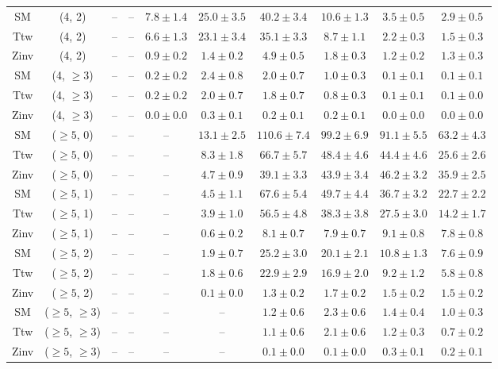 \begin{table}[h!]
{\begin{tabular}{cccccccccc}
	SM & (4, 2) & -- & -- & $7.8\pm 1.4$ & $25.0\pm 3.5$ & $40.2\pm 3.4$ & $10.6\pm 1.3$ & $3.5\pm 0.5$ & $2.9\pm 0.5$ \\[0.5ex] 
	Ttw & (4, 2) & -- & -- & $6.6\pm 1.3$ & $23.1\pm 3.4$ & $35.1\pm 3.3$ & $8.7\pm 1.1$ & $2.2\pm 0.3$ & $1.5\pm 0.3$ \\[0.5ex] 
	Zinv & (4, 2) & -- & -- & $0.9\pm 0.2$ & $1.4\pm 0.2$ & $4.9\pm 0.5$ & $1.8\pm 0.3$ & $1.2\pm 0.2$ & $1.3\pm 0.3$ \\[0.5ex] 
	SM & (4, $\ge3$) & -- & -- & $0.2\pm 0.2$ & $2.4\pm 0.8$ & $2.0\pm 0.7$ & $1.0\pm 0.3$ & $0.1\pm 0.1$ & $0.1\pm 0.1$ \\[0.5ex] 
	Ttw & (4, $\ge3$) & -- & -- & $0.2\pm 0.2$ & $2.0\pm 0.7$ & $1.8\pm 0.7$ & $0.8\pm 0.3$ & $0.1\pm 0.1$ & $0.1\pm 0.0$ \\[0.5ex] 
	Zinv & (4, $\ge3$) & -- & -- & $0.0\pm 0.0$ & $0.3\pm 0.1$ & $0.2\pm 0.1$ & $0.2\pm 0.1$ & $0.0\pm 0.0$ & $0.0\pm 0.0$ \\[0.5ex] 
	SM & ($\ge5$, 0) & -- & -- & -- & $13.1\pm 2.5$ & $110.6\pm 7.4$ & $99.2\pm 6.9$ & $91.1\pm 5.5$ & $63.2\pm 4.3$ \\[0.5ex] 
	Ttw & ($\ge5$, 0) & -- & -- & -- & $8.3\pm 1.8$ & $66.7\pm 5.7$ & $48.4\pm 4.6$ & $44.4\pm 4.6$ & $25.6\pm 2.6$ \\[0.5ex] 
	Zinv & ($\ge5$, 0) & -- & -- & -- & $4.7\pm 0.9$ & $39.1\pm 3.3$ & $43.9\pm 3.4$ & $46.2\pm 3.2$ & $35.9\pm 2.5$ \\[0.5ex] 
	SM & ($\ge5$, 1) & -- & -- & -- & $4.5\pm 1.1$ & $67.6\pm 5.4$ & $49.7\pm 4.4$ & $36.7\pm 3.2$ & $22.7\pm 2.2$ \\[0.5ex] 
	Ttw & ($\ge5$, 1) & -- & -- & -- & $3.9\pm 1.0$ & $56.5\pm 4.8$ & $38.3\pm 3.8$ & $27.5\pm 3.0$ & $14.2\pm 1.7$ \\[0.5ex] 
	Zinv & ($\ge5$, 1) & -- & -- & -- & $0.6\pm 0.2$ & $8.1\pm 0.7$ & $7.9\pm 0.7$ & $9.1\pm 0.8$ & $7.8\pm 0.8$ \\[0.5ex] 
	SM & ($\ge5$, 2) & -- & -- & -- & $1.9\pm 0.7$ & $25.2\pm 3.0$ & $20.1\pm 2.1$ & $10.8\pm 1.3$ & $7.6\pm 0.9$ \\[0.5ex] 
	Ttw & ($\ge5$, 2) & -- & -- & -- & $1.8\pm 0.6$ & $22.9\pm 2.9$ & $16.9\pm 2.0$ & $9.2\pm 1.2$ & $5.8\pm 0.8$ \\[0.5ex] 
	Zinv & ($\ge5$, 2) & -- & -- & -- & $0.1\pm 0.0$ & $1.3\pm 0.2$ & $1.7\pm 0.2$ & $1.5\pm 0.2$ & $1.5\pm 0.2$ \\[0.5ex] 
	SM & ($\ge5$, $\ge3$) & -- & -- & -- & -- & $1.2\pm 0.6$ & $2.3\pm 0.6$ & $1.4\pm 0.4$ & $1.0\pm 0.3$ \\[0.5ex] 
	Ttw & ($\ge5$, $\ge3$) & -- & -- & -- & -- & $1.1\pm 0.6$ & $2.1\pm 0.6$ & $1.2\pm 0.3$ & $0.7\pm 0.2$ \\[0.5ex] 
	Zinv & ($\ge5$, $\ge3$) & -- & -- & -- & -- & $0.1\pm 0.0$ & $0.1\pm 0.0$ & $0.3\pm 0.1$ & $0.2\pm 0.1$ \\[0.5ex] 
	\hline
	\hline
\end{tabular}}
\end{table}
